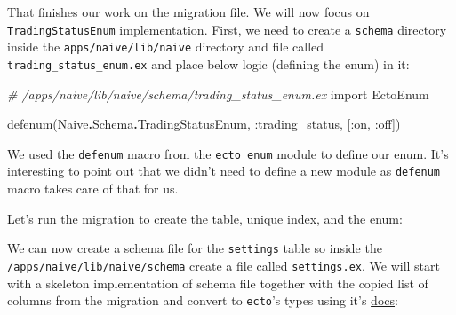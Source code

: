 \documentclass[
  oneside]{book}
\newenvironment{Shaded}{\begin{snugshade}}{\end{snugshade}}
\newcommand{\CommentTok}[1]{\textcolor[rgb]{0.56,0.35,0.01}{\textit{#1}}}
\newcommand{\ConstantTok}[1]{\textcolor[rgb]{0.00,0.00,0.00}{#1}}
\newcommand{\ExtensionTok}[1]{#1}
\newcommand{\ImportTok}[1]{#1}
\newcommand{\NormalTok}[1]{#1}
\newcommand{\OperatorTok}[1]{\textcolor[rgb]{0.81,0.36,0.00}{\textbf{#1}}}
\newcommand{\StringTok}[1]{\textcolor[rgb]{0.31,0.60,0.02}{#1}}
\newcommand{\VariableTok}[1]{\textcolor[rgb]{0.00,0.00,0.00}{#1}}
\begin{document}
That finishes our work on the migration file. We will now focus on \texttt{TradingStatusEnum} implementation. First, we need to create a \texttt{schema} directory inside the \texttt{apps/naive/lib/naive} directory and file called \texttt{trading\_status\_enum.ex} and place below logic (defining the enum) in it:

\begin{Shaded}
\begin{Highlighting}[]
\CommentTok{\# /apps/naive/lib/naive/schema/trading\_status\_enum.ex}
\ImportTok{import} \ConstantTok{EctoEnum}

\NormalTok{defenum(}\ConstantTok{Naive}\OperatorTok{.}\ConstantTok{Schema}\OperatorTok{.}\ConstantTok{TradingStatusEnum}\NormalTok{, }\VariableTok{:trading\_status}\NormalTok{, [}\VariableTok{:on}\NormalTok{, }\VariableTok{:off}\NormalTok{])}
\end{Highlighting}
\end{Shaded}

We used the \texttt{defenum} macro from the \texttt{ecto\_enum} module to define our enum. It's interesting to point out that we didn't need to define a new module as \texttt{defenum} macro takes care of that for us.

Let's run the migration to create the table, unique index, and the enum:

\begin{Shaded}
\end{Shaded}

We can now create a schema file for the \texttt{settings} table so inside the \texttt{/apps/naive/lib/naive/schema} create a file called \texttt{settings.ex}. We will start with a skeleton implementation of schema file together with the copied list of columns from the migration and convert to \texttt{ecto}'s types using it's \href{https://hexdocs.pm/ecto/Ecto.Schema.html\#module-primitive-types}{docs}:
\end{document}
